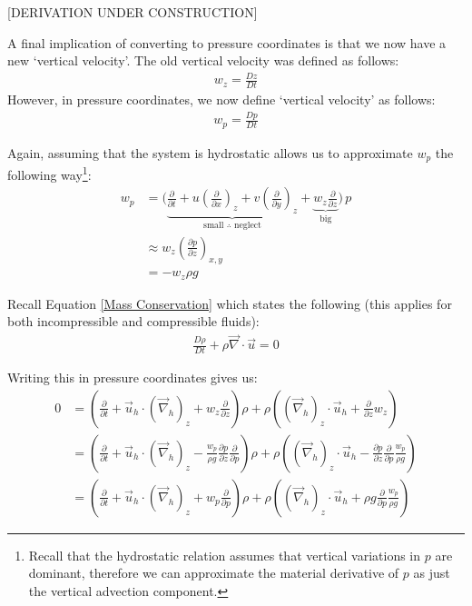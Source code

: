 [DERIVATION UNDER CONSTRUCTION]

A final implication of converting to pressure coordinates is that we now have a new `vertical velocity'. The old vertical velocity was defined as follows:
\begin{align*}
    w_z = \frac{D z}{Dt}
\end{align*}
However, in pressure coordinates, we now define `vertical velocity' as follows:
\begin{align*}
    w_p = \frac{D p}{Dt}
\end{align*}

Again, assuming that the system is hydrostatic allows us to approximate $w_p$ the following way\footnote{
    Recall that the hydrostatic relation assumes that vertical variations in $p$ are dominant, therefore we can approximate the material derivative of $p$ as just the vertical advection component.
}:
\begin{align*}
    w_p &= \biggl( \underbrace{\frac{\partial }{\partial t} + u\left( \frac{\partial}{\partial x} \right)_{z}+v\left( \frac{\partial}{\partial y} \right)_{z}}_{\text{small }\therefore \text{ neglect}}+\underbrace{w_z \frac{\partial}{\partial z}}_{\text{big}} \biggr)\, p
    \\
    &\approx w_z \left( \frac{\partial p}{\partial z} \right)_{x,y}
    \\
    & = -w_z\rho g
\end{align*}

Recall Equation \ref{Mass Conservation} which states the following (this applies for both incompressible and compressible fluids):
\begin{align*}
    \frac{D\rho}{Dt}+\rho\vec{\nabla}\cdot\vec{u}=0
\end{align*}

Writing this in pressure coordinates gives us:
\begin{align*}
    0&=\left( 
        \frac{\partial}{\partial t} 
        + \vec{u}_h \cdot \left( \vec{\nabla}_h \right)_z
        + w_z \frac{\partial}{\partial z}
    \right)\rho
    + \rho \left( 
        \left( \vec{\nabla}_h  \right)_z \cdot \vec{u}_h
        + \frac{\partial}{\partial z}w_z
    \right)
    \\
    &=\left( 
        \frac{\partial}{\partial t} 
        + \vec{u}_h \cdot \left( \vec{\nabla}_h \right)_z
        - \frac{w_p}{\rho g} \frac{\partial p}{\partial z}\frac{\partial}{\partial p}
    \right)\rho
    + \rho \left( 
        \left( \vec{\nabla}_h  \right)_z \cdot \vec{u}_h
        - \frac{\partial p}{\partial z} \frac{\partial}{\partial p} \frac{w_p}{\rho g}
    \right)
    \\
    &=\left( 
        \frac{\partial}{\partial t} 
        + \vec{u}_h \cdot \left( \vec{\nabla}_h \right)_z
        + w_p \frac{\partial}{\partial p}
    \right)\rho
    + \rho \left( 
        \left( \vec{\nabla}_h  \right)_z \cdot \vec{u}_h
        +\rho g \frac{\partial}{\partial p} \frac{w_p}{\rho g}
    \right)
\end{align*}


